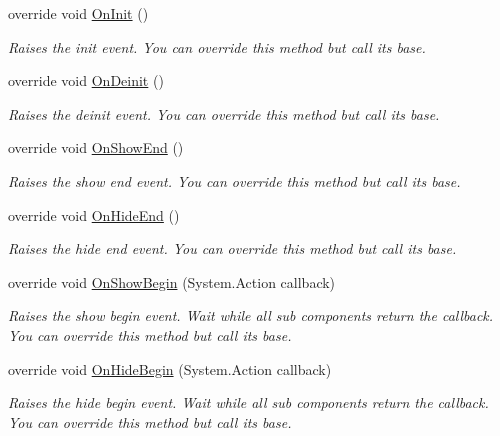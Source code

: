 \begin{DoxyCompactItemize}
override void \hyperlink{class_unity_engine_1_1_u_i_1_1_windows_1_1_window_component_a1bbe16844e4db2b628587023bcc45117}{On\+Init} ()
\begin{DoxyCompactList}\small\item\em Raises the init event. You can override this method but call it\textquotesingle{}s base. \end{DoxyCompactList}\item 
override void \hyperlink{class_unity_engine_1_1_u_i_1_1_windows_1_1_window_component_aeecca9f3f46bb2cef3425c9d8b6b7618}{On\+Deinit} ()
\begin{DoxyCompactList}\small\item\em Raises the deinit event. You can override this method but call it\textquotesingle{}s base. \end{DoxyCompactList}\item 
override void \hyperlink{class_unity_engine_1_1_u_i_1_1_windows_1_1_window_component_a7565d701351e1569d51ab4122ecfcaa0}{On\+Show\+End} ()
\begin{DoxyCompactList}\small\item\em Raises the show end event. You can override this method but call it\textquotesingle{}s base. \end{DoxyCompactList}\item 
override void \hyperlink{class_unity_engine_1_1_u_i_1_1_windows_1_1_window_component_a7f130d48dc990f69f45b35a7ebcd915a}{On\+Hide\+End} ()
\begin{DoxyCompactList}\small\item\em Raises the hide end event. You can override this method but call it\textquotesingle{}s base. \end{DoxyCompactList}\item 
override void \hyperlink{class_unity_engine_1_1_u_i_1_1_windows_1_1_window_component_a3851b1765a8aca39a5b410043d858d3a}{On\+Show\+Begin} (System.\+Action callback)
\begin{DoxyCompactList}\small\item\em Raises the show begin event. Wait while all sub components return the callback. You can override this method but call it\textquotesingle{}s base. \end{DoxyCompactList}\item 
override void \hyperlink{class_unity_engine_1_1_u_i_1_1_windows_1_1_window_component_abbe2f59e0cb9c39d864bfe28c0de743a}{On\+Hide\+Begin} (System.\+Action callback)
\begin{DoxyCompactList}\small\item\em Raises the hide begin event. Wait while all sub components return the callback. You can override this method but call it\textquotesingle{}s base. \end{DoxyCompactList}\end{DoxyCompactItemize}
